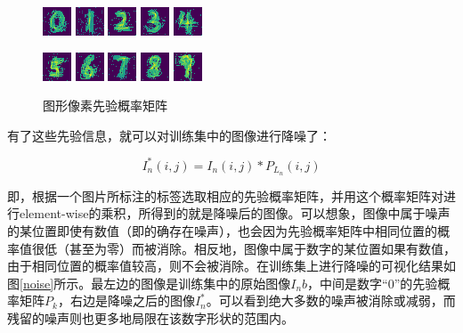 \documentclass[UTF8]{ctexart}
\begin{document}
\begin{figure}
	\centering
	\includegraphics{0}
	\includegraphics{1}
	\includegraphics{2}
	\includegraphics{3}
	\includegraphics{4}
	
	\includegraphics{5}
	\includegraphics{6}
	\includegraphics{7}
	\includegraphics{8}
	\includegraphics{9}
	\caption{图形像素先验概率矩阵}
	\label{prior}
\end{figure}

有了这些先验信息，就可以对训练集中的图像进行降噪了：

$$I^*_n(i, j) = I_n(i, j) * P_{L_n}(i, j)$$

即，根据一个图片所标注的标签选取相应的先验概率矩阵，并用这个概率矩阵对进行element-wise的乘积，所得到的就是降噪后的图像。可以想象，图像中属于噪声的某位置即使有数值（即的确存在噪声），也会因为先验概率矩阵中相同位置的概率值很低（甚至为零）而被消除。相反地，图像中属于数字的某位置如果有数值，由于相同位置的概率值较高，则不会被消除。在训练集上进行降噪的可视化结果如图\ref{noise}所示。最左边的图像是训练集中的原始图像$I_nb$，中间是数字“0”的先验概率矩阵$P_k$，右边是降噪之后的图像$I^*_n$。可以看到绝大多数的噪声被消除或减弱，而残留的噪声则也更多地局限在该数字形状的范围内。
\end{document}
